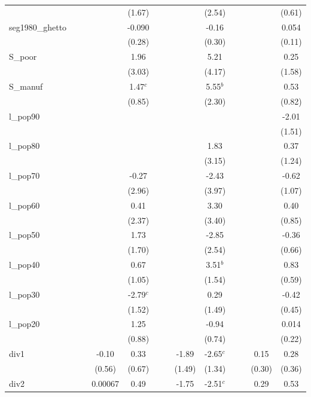 \documentclass[]{article}
\begin{document}
\begin{tabular}{lcccccccccccc}
 &  &  &  & (1.67) &  &  &  & (2.54) &  &  &  & (0.61) \\
seg1980\_ghetto &  &  &  & -0.090 &  &  &  & -0.16 &  &  &  & 0.054 \\
 &  &  &  & (0.28) &  &  &  & (0.30) &  &  &  & (0.11) \\
S\_poor &  &  &  & 1.96 &  &  &  & 5.21 &  &  &  & 0.25 \\
 &  &  &  & (3.03) &  &  &  & (4.17) &  &  &  & (1.58) \\
S\_manuf &  &  &  & 1.47$^c$ &  &  &  & 5.55$^b$ &  &  &  & 0.53 \\
 &  &  &  & (0.85) &  &  &  & (2.30) &  &  &  & (0.82) \\
l\_pop90 &  &  &  &  &  &  &  &  &  &  &  & -2.01 \\
 &  &  &  &  &  &  &  &  &  &  &  & (1.51) \\
l\_pop80 &  &  &  &  &  &  &  & 1.83 &  &  &  & 0.37 \\
 &  &  &  &  &  &  &  & (3.15) &  &  &  & (1.24) \\
l\_pop70 &  &  &  & -0.27 &  &  &  & -2.43 &  &  &  & -0.62 \\
 &  &  &  & (2.96) &  &  &  & (3.97) &  &  &  & (1.07) \\
l\_pop60 &  &  &  & 0.41 &  &  &  & 3.30 &  &  &  & 0.40 \\
 &  &  &  & (2.37) &  &  &  & (3.40) &  &  &  & (0.85) \\
l\_pop50 &  &  &  & 1.73 &  &  &  & -2.85 &  &  &  & -0.36 \\
 &  &  &  & (1.70) &  &  &  & (2.54) &  &  &  & (0.66) \\
l\_pop40 &  &  &  & 0.67 &  &  &  & 3.51$^b$ &  &  &  & 0.83 \\
 &  &  &  & (1.05) &  &  &  & (1.54) &  &  &  & (0.59) \\
l\_pop30 &  &  &  & -2.79$^c$ &  &  &  & 0.29 &  &  &  & -0.42 \\
 &  &  &  & (1.52) &  &  &  & (1.49) &  &  &  & (0.45) \\
l\_pop20 &  &  &  & 1.25 &  &  &  & -0.94 &  &  &  & 0.014 \\
 &  &  &  & (0.88) &  &  &  & (0.74) &  &  &  & (0.22) \\
div1 &  &  & -0.10 & 0.33 &  &  & -1.89 & -2.65$^c$ &  &  & 0.15 & 0.28 \\
 &  &  & (0.56) & (0.67) &  &  & (1.49) & (1.34) &  &  & (0.30) & (0.36) \\
div2 &  &  & 0.00067 & 0.49 &  &  & -1.75 & -2.51$^c$ &  &  & 0.29 & 0.53 \\

\end{tabular}
\end{document}
